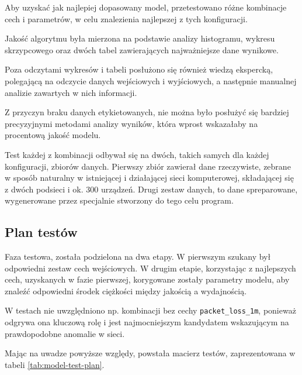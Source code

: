 Aby uzyskać jak najlepiej dopasowany model, przetestowano różne kombinacje cech i parametrów, w celu znalezienia najlepszej z tych konfiguracji.

Jakość algorytmu była mierzona na podstawie analizy histogramu, wykresu skrzypcowego oraz dwóch tabel zawierających najważniejsze dane wynikowe.

Poza odczytami wykresów i tabeli posłużono się również wiedzą ekspercką, polegającą na odczycie danych wejściowych i wyjściowych, a następnie manualnej analizie zawartych w nich informacji.

Z przyczyn braku danych etykietowanych, nie można było posłużyć się bardziej precyzyjnymi metodami analizy wyników, która wprost wskazałaby na procentową jakość modelu.

Test każdej z kombinacji odbywał się na dwóch, takich samych dla każdej konfiguracji, zbiorów danych. Pierwszy zbiór zawierał dane rzeczywiste, zebrane w sposób naturalny w istniejącej i działającej sieci komputerowej, składającej się z dwóch podsieci i ok. 300 urządzeń. Drugi zestaw danych, to dane spreparowane, wygenerowane przez specjalnie stworzony do tego celu program.

\subsection{Plan testów}

Faza testowa, została podzielona na dwa etapy. W pierwszym szukany był odpowiedni zestaw cech wejściowych. W drugim etapie, korzystając z najlepszych cech, uzyskanych w fazie pierwszej, korygowane zostały parametry modelu, aby znaleźć odpowiedni środek ciężkości między jakością a wydajnością.

W testach nie uwzględniono np. kombinacji bez cechy \texttt{packet\_loss\_1m}, ponieważ odgrywa ona kluczową rolę i jest najmocniejszym kandydatem wskazującym na prawdopodobne anomalie w sieci.

Mając na uwadze powyższe względy, powstała macierz testów, zaprezentowana w tabeli \ref{tab:model-test-plan}.

